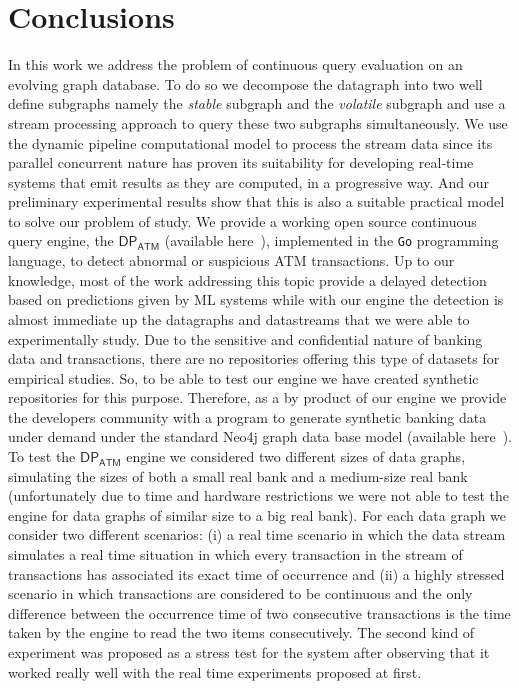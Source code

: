 \newpage
\section{Conclusions}
\label{sec:concl}

In this work we address the problem of continuous query evaluation on an evolving graph database. 
To do so we decompose the datagraph into two well define subgraphs namely the \emph{stable} subgraph and 
the \emph{volatile} subgraph and use a stream processing approach to query these two subgraphs simultaneously.
We use the dynamic pipeline computational model to process the stream data since its parallel concurrent 
nature has proven its suitability for developing real-time systems that emit results as they are computed, 
in a progressive way. And our preliminary experimental results show that this is also a suitable practical model to solve our problem of study.
We provide a working open source continuous query engine, the $\mathsf{DP_{ATM}}$ (available here~\cite{ATM-DP-github}), 
implemented in the \texttt{Go} programming language, to detect abnormal or suspicious ATM transactions. Up to our knowledge, 
most of the work addressing this topic provide a delayed detection based on predictions given by ML systems while 
with our engine the detection is almost immediate up the datagraphs and datastreams that we were able to experimentally study. 
Due to the sensitive and confidential  nature of banking data and transactions, there are no repositories offering this type of datasets 
for empirical studies. So, to be able to test our engine we have created synthetic repositories for this purpose. 
Therefore, as a by product of our engine we provide the developers community with a program to generate synthetic banking data 
under demand under the standard Neo4j graph data base model (available here~\cite{ATM-DP-github}).\\

To test the $\mathsf{DP_{ATM}}$  engine we considered two different sizes of data graphs, 
simulating the sizes of both a small real bank and a medium-size real bank 
(unfortunately due to time and hardware restrictions we were not able to test the engine for data graphs of similar size to a big real bank). 
For each data graph we consider two different scenarios: 
(i) a real time scenario in which the data stream simulates a real time situation in which every transaction in the stream of 
transactions has associated its exact time of occurrence and 
(ii) a highly stressed scenario in which transactions are considered to be continuous and the only difference between the occurrence 
time of two consecutive transactions is the time taken by the engine to read the two items consecutively.
The second kind of experiment was proposed as a stress test for the system after observing that it worked really well with the real time experiments proposed at first.\\

